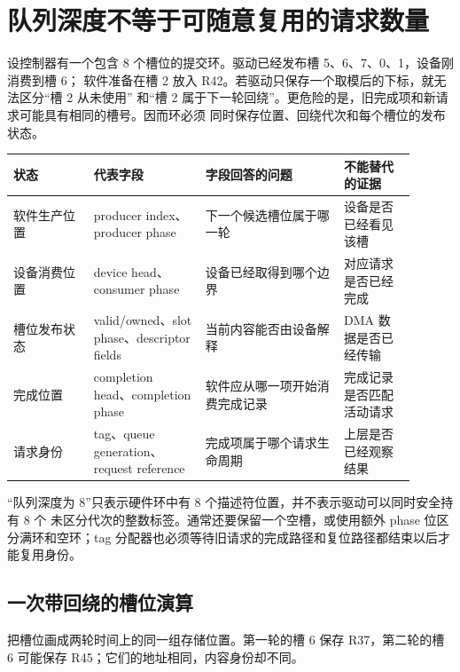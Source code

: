 \section{队列深度不等于可随意复用的请求数量}

设控制器有一个包含 8 个槽位的提交环。驱动已经发布槽 5、6、7、0、1，设备刚消费到槽 6；
软件准备在槽 2 放入 R42。若驱动只保存一个取模后的下标，就无法区分“槽 2 从未使用”
和“槽 2 属于下一轮回绕”。更危险的是，旧完成项和新请求可能具有相同的槽号。因而环必须
同时保存位置、回绕代次和每个槽位的发布状态。

\begin{longtable}{|L{0.18\linewidth}|L{0.25\linewidth}|L{0.31\linewidth}|L{0.16\linewidth}|}
\hline
状态 & 代表字段 & 字段回答的问题 & 不能替代的证据 \\ \hline
软件生产位置 & producer index、producer phase & 下一个候选槽位属于哪一轮 &
设备是否已经看见该槽 \\\tablerowrule
设备消费位置 & device head、consumer phase & 设备已经取得到哪个边界 &
对应请求是否已经完成 \\\tablerowrule
槽位发布状态 & valid/owned、slot phase、descriptor fields & 当前内容能否由设备解释 &
DMA 数据是否已经传输 \\\tablerowrule
完成位置 & completion head、completion phase & 软件应从哪一项开始消费完成记录 &
完成记录是否匹配活动请求 \\\tablerowrule
请求身份 & tag、queue generation、request reference & 完成项属于哪个请求生命周期 &
上层是否已经观察结果 \\ \hline
\end{longtable}

“队列深度为 8”只表示硬件环中有 8 个描述符位置，并不表示驱动可以同时安全持有 8 个
未区分代次的整数标签。通常还要保留一个空槽，或使用额外 phase 位区分满环和空环；tag
分配器也必须等待旧请求的完成路径和复位路径都结束以后才能复用身份。

\subsection{一次带回绕的槽位演算}

把槽位画成两轮时间上的同一组存储位置。第一轮的槽 6 保存 R37，第二轮的槽 6 可能保存
R45；它们的地址相同，内容身份却不同。

